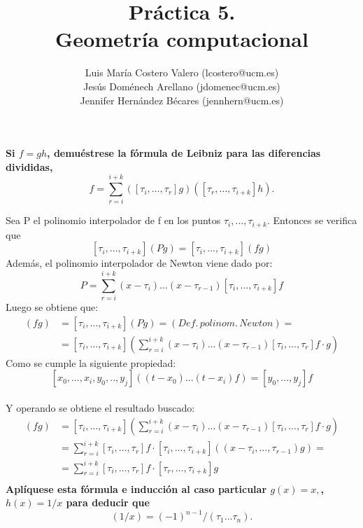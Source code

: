\documentclass[12pt,a4paper]{article}
\title{Práctica 5. \\ Geometría computacional}
\author{Luis María Costero Valero (lcostero@ucm.es)\\ Jesús Doménech
  Arellano (jdomenec@ucm.es) \\ Jennifer Hernández Bécares (jennhern@ucm.es)}
\date{}
\begin{document}
\maketitle

\textbf{Si $f=gh$, demuéstrese la fórmula de Leibniz para las diferencias divididas,}
\begin{equation*}
  [\tau_i,\dots,\tau_{i+k}]f=\sum\limits_{r=i}^{i+k}([\tau_i,\dots,\tau_r]g)([\tau_r,\dots,\tau_{i+k}]h).
\end{equation*}

Sea P el polinomio interpolador de f en los puntos $\tau_i, ... ,
\tau_{i+k}$. Entonces se verifica que $$[\tau_{i}, ..., \tau_{i+k}](Pg) =
[\tau_i, ..., \tau_{i+k}](fg)$$
Además, el polinomio interpolador de Newton viene dado por:
$$ P = \sum\limits^{i+k}_{r=i}(x-\tau_i)\dots(x-\tau_{r-1})[\tau_i,\dots,\tau_{i+k}]f$$
Luego se obtiene que:
\begin{align*}
  [\tau_i,\dots,\tau_{i+k}](fg) &= [\tau_i,\dots,\tau_{i+k}](Pg) = (Def.\,polinom.\,Newton)=\\
                      &= [\tau_i,\dots,\tau_{i+k}]\left(\sum\limits_{r=i}^{i+k}(x-\tau_i)...(x-\tau_{r-1})[\tau_i,...,\tau_r]f
                        \cdot g\right)
\end{align*}
Como se cumple la siguiente propiedad:
$$[x_0, ..., x_i, y_0, .., y_j]((t-x_0)...(t-x_i)f) = [y_0,...,y_j]f$$\\
Y operando se obtiene el resultado buscado:
\begin{align*}
  [\tau_i,\dots,\tau_{i+k}](fg) &= [\tau_i,\dots,\tau_{i+k}]\left(\sum\limits_{r=i}^{i+k}(x-\tau_i)...(x-\tau_{r-1})[\tau_i,...,\tau_r]f
                        \cdot g\right)\\
                      &=\sum\limits^{i+k}_{r=i}[\tau_i,\dots,\tau_{r}]f \cdot
                        [\tau_i,\dots,\tau_{i+k}]\left((x-\tau_i,\dots,\tau_{r-1})g\right)=\\
                      &=\sum\limits^{i+k}_{r=i}[\tau_i,\dots,\tau_r]f \cdot [\tau_r,
                        \dots, \tau_{i+k}]g\\
\end{align*}
\newpage{}
\textbf{Aplíquese esta fórmula e inducción al caso particular $g(x)=x,$, $h(x)=1/x$ para deducir que}
\begin{equation*}
  [\tau_1,...,\tau_n](1/x)=(-1)^{n-1}/(\tau_1...\tau_n).
\end{equation*}
\end{document}
